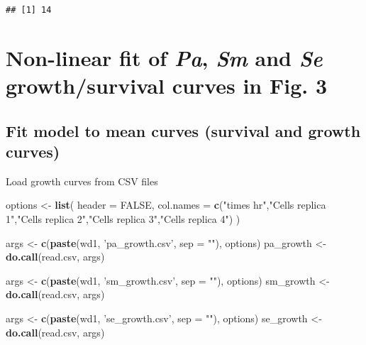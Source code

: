 \documentclass[]{article}
\newenvironment{Shaded}{\begin{snugshade}}{\end{snugshade}}
\newcommand{\KeywordTok}[1]{\textcolor[rgb]{0.13,0.29,0.53}{\textbf{#1}}}
\newcommand{\DataTypeTok}[1]{\textcolor[rgb]{0.13,0.29,0.53}{#1}}
\newcommand{\StringTok}[1]{\textcolor[rgb]{0.31,0.60,0.02}{#1}}
\newcommand{\OtherTok}[1]{\textcolor[rgb]{0.56,0.35,0.01}{#1}}
\newcommand{\NormalTok}[1]{#1}
\begin{document}
\begin{verbatim}
## [1] 14
\end{verbatim}

\section{\texorpdfstring{Non-linear fit of \emph{Pa}, \emph{Sm} and
\emph{Se} growth/survival curves in Fig.
3}{Non-linear fit of Pa, Sm and Se growth/survival curves in Fig. 3}}\label{non-linear-fit-of-pa-sm-and-se-growthsurvival-curves-in-fig.-3}

\subsection{Fit model to mean curves (survival and growth
curves)}\label{fit-model-to-mean-curves-survival-and-growth-curves}

Load growth curves from CSV files

\begin{Shaded}
\begin{Highlighting}[]
\NormalTok{options <-}\StringTok{ }\KeywordTok{list}\NormalTok{(}
            \DataTypeTok{header =} \OtherTok{FALSE}\NormalTok{, }
            \DataTypeTok{col.names =}  \KeywordTok{c}\NormalTok{(}\StringTok{"times hr"}\NormalTok{,}\StringTok{"Cells replica 1"}\NormalTok{,}\StringTok{"Cells replica 2"}\NormalTok{,}\StringTok{"Cells replica 3"}\NormalTok{,}\StringTok{"Cells replica 4"}\NormalTok{)}
\NormalTok{            )}

\NormalTok{args <-}\StringTok{ }\KeywordTok{c}\NormalTok{(}\KeywordTok{paste}\NormalTok{(wd1, }\StringTok{'pa_growth.csv'}\NormalTok{, }\DataTypeTok{sep =} \StringTok{""}\NormalTok{), options)}
\NormalTok{pa_growth <-}\StringTok{ }\KeywordTok{do.call}\NormalTok{(read.csv, args)}

\NormalTok{args <-}\StringTok{ }\KeywordTok{c}\NormalTok{(}\KeywordTok{paste}\NormalTok{(wd1, }\StringTok{'sm_growth.csv'}\NormalTok{, }\DataTypeTok{sep =} \StringTok{""}\NormalTok{), options)}
\NormalTok{sm_growth <-}\StringTok{ }\KeywordTok{do.call}\NormalTok{(read.csv, args)}

\NormalTok{args <-}\StringTok{ }\KeywordTok{c}\NormalTok{(}\KeywordTok{paste}\NormalTok{(wd1, }\StringTok{'se_growth.csv'}\NormalTok{, }\DataTypeTok{sep =} \StringTok{""}\NormalTok{), options)}
\NormalTok{se_growth <-}\StringTok{ }\KeywordTok{do.call}\NormalTok{(read.csv, args)}
\end{Highlighting}
\end{Shaded}
\end{document}
